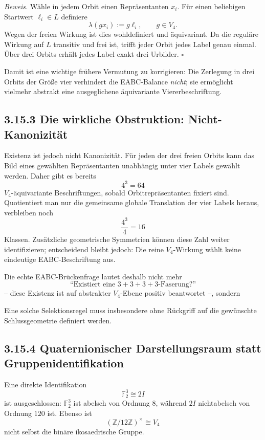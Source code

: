 \documentclass[11pt,a4paper]{article}
\begin{document}
\emph{Beweis.}
Wähle in jedem Orbit einen Repräsentanten $x_i$. Für einen beliebigen Startwert $\ell_i\in L$ definiere
\[
\lambda(gx_i):=g\ell_i,\qquad g\in V_4.
\]
Wegen der freien Wirkung ist dies wohldefiniert und äquivariant. Da die reguläre Wirkung auf $L$ transitiv und frei ist, trifft jeder Orbit jedes Label genau einmal. Über drei Orbits erhält jedes Label exakt drei Urbilder. \hfill$\square$

Damit ist eine wichtige frühere Vermutung zu korrigieren: Die Zerlegung in drei Orbits der Größe vier verhindert die EABC-Balance \emph{nicht}; sie ermöglicht vielmehr abstrakt eine ausgeglichene äquivariante Viererbeschriftung.

\subsection*{3.15.3 Die wirkliche Obstruktion: Nicht-Kanonizität}
Existenz ist jedoch nicht Kanonizität. Für jeden der drei freien Orbits kann das Bild eines gewählten Repräsentanten unabhängig unter vier Labels gewählt werden. Daher gibt es bereits
\[
4^3=64
\]
$V_4$-äquivariante Beschriftungen, sobald Orbitrepräsentanten fixiert sind. Quotientiert man nur die gemeinsame globale Translation der vier Labels heraus, verbleiben noch
\[
\frac{4^3}{4}=16
\]
Klassen. Zusätzliche geometrische Symmetrien können diese Zahl weiter identifizieren; entscheidend bleibt jedoch: Die reine $V_4$-Wirkung wählt keine eindeutige EABC-Beschriftung aus.

Die echte EABC-Brückenfrage lautet deshalb nicht mehr
\[
\text{``Existiert eine }3+3+3+3\text{-Faserung?''}
\]
-- diese Existenz ist auf abstrakter $V_4$-Ebene positiv beantwortet --, sondern
\begin{center}
\end{center}
Eine solche Selektionsregel muss insbesondere ohne Rückgriff auf die gewünschte Schlussgeometrie definiert werden.

\subsection*{3.15.4 Quaternionischer Darstellungsraum statt Gruppenidentifikation}
Eine direkte Identifikation
\[
\mathbb F_2^3\cong 2I
\]
ist ausgeschlossen: $\mathbb F_2^3$ ist abelsch von Ordnung $8$, während $2I$ nichtabelsch von Ordnung $120$ ist. Ebenso ist
\[
(\mathbb Z/12\mathbb Z)^\times\cong V_4
\]
nicht selbst die binäre ikosaedrische Gruppe.
\end{document}
